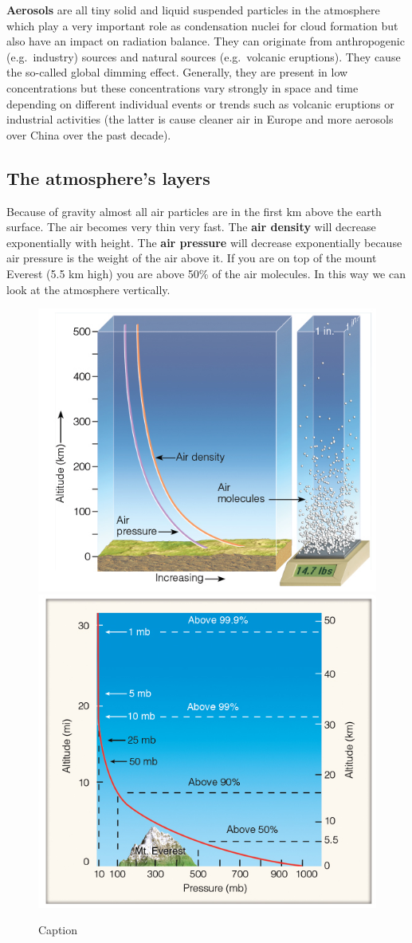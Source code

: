 \documentclass[12pt,oneside]{book}
\begin{document}
\textbf{Aerosols} are all tiny solid and liquid suspended particles in
the atmosphere which play a very important role as condensation nuclei
for cloud formation but also have an impact on radiation balance. They
can originate from anthropogenic (e.g.~industry) sources and natural
sources (e.g.~volcanic eruptions). They cause the so-called global
dimming effect. Generally, they are present in low concentrations but
these concentrations vary strongly in space and time depending on
different individual events or trends such as volcanic eruptions or
industrial activities (the latter is cause cleaner air in Europe and
more aerosols over China over the past decade).

\subsection{The atmosphere's layers}\label{the-atmospheres-layers}

Because of gravity almost all air particles are in the first km above
the earth surface. The air becomes very thin very fast. The \textbf{air
density} will decrease exponentially with height. The \textbf{air
pressure} will decrease exponentially because air pressure is the weight
of the air above it. If you are on top of the mount Everest (5.5 km
high) you are above 50\% of the air molecules. In this way we can look
at the atmosphere vertically.

\begin{figure}

{\centering \includegraphics[width=0.4\linewidth]{figures/Figure12a} \includegraphics[width=0.4\linewidth]{figures/Figure12b} 

}

\caption{Caption}\label{fig:Layers}
\end{figure}
\end{document}

